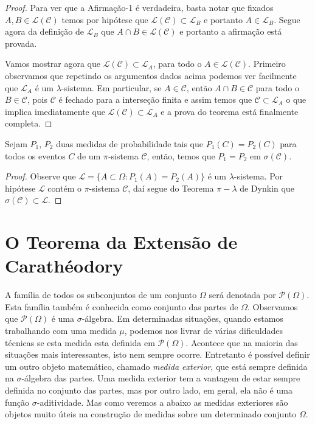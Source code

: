 \begin{proof}
	Para ver que a Afirmação-1 é verdadeira, basta notar que fixados 
	$A,B\in\mathcal{L}(\mathcal{C})$ temos por hipótese que
	$\mathcal{L}(\mathcal{C}) \subset  \mathcal{L}_B$ e portanto 
	$A\in\mathcal{L}_B$. Segue agora da definição de $\mathcal{L}_B$ que
	$A\cap B\in \mathcal{L}(\mathcal{C})$ e portanto a afirmação está provada.
	
    
    
    Vamos mostrar agora que $ \mathcal{L}(\mathcal{C}) \subset  \mathcal{L}_A$, para todo o 
    $A \in  \mathcal{L}(\mathcal{C})$.
    Primeiro observamos que repetindo os argumentos dados acima podemos ver facilmente que 
    $\mathcal{L} _A$ é um $\lambda$-sistema. 
    Em particular, se 
    $A \in \mathcal{C}$, então $A \cap B \in \mathcal{C}$ para todo o $B \in\mathcal{C}$,
    pois $\mathcal{C}$ é fechado para a interseção finita e assim temos que 
    $\mathcal{C} \subset\mathcal{L}_A$ o que  
    implica imediatamente que $\mathcal{L}(\mathcal{C}) \subset \mathcal{L}_A $ 
    e a prova do teorema está finalmente completa.         
\end{proof}


\begin{corolario}[Unicidade]
    Sejam $P_1$, $P_2$ duas medidas de probabilidade tais que $P_1(C)=P_2(C)$ para todos os
    eventos $C$ de um $\pi$-sistema $\mathcal{C}$, então, temos que $P_1=P_2$ em
    $\sigma(\mathcal{C})$.
\end{corolario}

\begin{proof}
    Observe que $\mathcal{L}  = \{A \subset \Omega: P_1(A) = P_2(A)\}$  é um $\lambda$-sistema. 
    Por hipótese $\mathcal{L}$ contém o $\pi$-sistema $\mathcal{C}$, daí
    segue do Teorema $\pi-\lambda$ de Dynkin que $\sigma(\mathcal{C}) \subset \mathcal{L}$.
\end{proof}

\section{O Teorema da Extensão de Carathéodory}


A família de todos os subconjuntos de um conjunto $\Omega$ será 
denotada por $\mathcal{P}(\Omega)$. Esta família também é conhecida como 
conjunto das partes de $\Omega$. Observamos que $\mathcal{P}(\Omega)$ é uma 
$\sigma$-álgebra.
Em determinadas situações, quando estamos trabalhando com uma medida $\mu$, 
podemos nos livrar de várias dificuldades técnicas se esta medida esta definida
em $\mathcal{P}(\Omega)$. Acontece que na maioria das situações mais 
interessantes, isto nem sempre ocorre. Entretanto é possível definir um outro objeto 
matemático, chamado {\it medida exterior}, que está sempre definida na 
$\sigma$-álgebra das partes.
Uma medida exterior tem a vantagem de estar sempre 
definida no conjunto das partes, mas por outro lado, em geral, 
ela não é uma função $\sigma$-aditividade. 
Mas como veremos a abaixo as medidas exteriores são objetos muito 
úteis na construção de medidas sobre um determinado conjunto $\Omega$.



